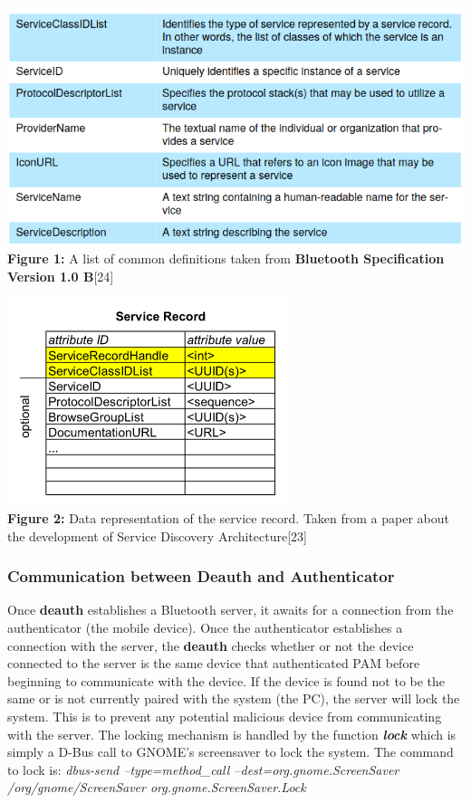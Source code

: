 \documentclass[letterpaper,twocolumn,10pt]{article}
\begin{document}
{{\hrulefill

\includegraphics[scale=0.3]{bluetooth-definitions.png}
\small \textbf{Figure 1:} A list of common definitions taken from \textbf{Bluetooth Specification Version 1.0 B}[24]

\includegraphics[scale=0.5]{bluetooth-service.png}\\
\small \textbf{Figure 2:} Data representation of the service record. Taken from a paper about the development of Service Discovery Architecture[23]

\normalsize
\subsubsection{Communication between Deauth and Authenticator}

Once \textbf{deauth} establishes a Bluetooth server, it awaits for a connection from the authenticator (the mobile device). Once the authenticator establishes a connection with the server, the \textbf{deauth} checks whether or not the device connected to the server is the same device that authenticated PAM before beginning to communicate with the device. If the device is found not to be the same or is not currently paired with the system (the PC), the server will lock the system. This is to prevent any potential malicious device from communicating with the server. The locking mechanism is handled by the function \textbf{\emph{lock}} which is simply a D-Bus call to GNOME's screensaver to lock the system. The command to lock is: \emph{dbus-send --type=method\_call --dest=org.gnome.ScreenSaver /org/gnome/ScreenSaver org.gnome.ScreenSaver.Lock}

}}
\end{document}
